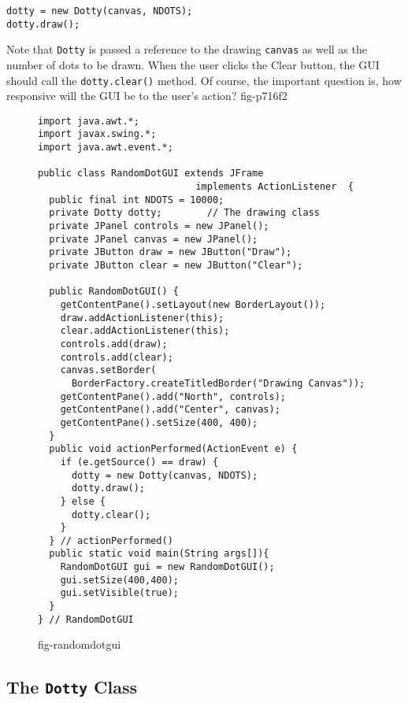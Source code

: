\begin{jjjlisting}
\begin{lstlisting}
dotty = new Dotty(canvas, NDOTS);
dotty.draw();
\end{lstlisting}
\end{jjjlisting}

\noindent Note that {\tt Dotty} is passed a reference to the drawing
{\tt canvas} as well as the number of dots to be drawn.   When the user
clicks the Clear button, the GUI should call the {\tt dotty.clear()}
method.  Of course, the important question is, how responsive will
the GUI be to the user's action?
{fig-p716f2}



\begin{figure}[h!]
\jjjprogstart
\begin{jjjlisting}
\begin{lstlisting}
import java.awt.*;
import javax.swing.*;
import java.awt.event.*;

public class RandomDotGUI extends JFrame 
                            implements ActionListener  {
  public final int NDOTS = 10000;
  private Dotty dotty;        // The drawing class
  private JPanel controls = new JPanel();
  private JPanel canvas = new JPanel();
  private JButton draw = new JButton("Draw");
  private JButton clear = new JButton("Clear");
 	
  public RandomDotGUI() {
    getContentPane().setLayout(new BorderLayout());
    draw.addActionListener(this);
    clear.addActionListener(this);
    controls.add(draw);
    controls.add(clear);
    canvas.setBorder(
      BorderFactory.createTitledBorder("Drawing Canvas"));
    getContentPane().add("North", controls);
    getContentPane().add("Center", canvas);
    getContentPane().setSize(400, 400);
  } 
  public void actionPerformed(ActionEvent e) {
    if (e.getSource() == draw) {
      dotty = new Dotty(canvas, NDOTS);
      dotty.draw();
    } else {
      dotty.clear();
    }
  } // actionPerformed()
  public static void main(String args[]){
    RandomDotGUI gui = new RandomDotGUI();
    gui.setSize(400,400);
    gui.setVisible(true);        
  }
} // RandomDotGUI
\end{lstlisting}
\end{jjjlisting}
{fig-randomdotgui}
\end{figure}

\subsection*{The {\tt Dotty} Class}

